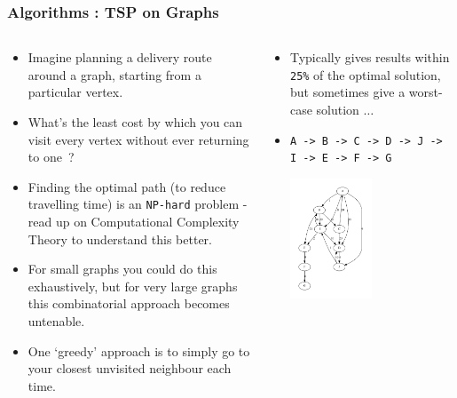 \begin{frame}[fragile]
\frametitle{Algorithms : TSP on Graphs}
\begin{columns}[T]

\begin{column}{0.45\textwidth}
\begin{itemize}[<+->]
\item Imagine planning a delivery route around a graph, starting from a particular vertex.
\item What's the least cost by which you can visit every vertex without ever returning to one~?
\item Finding the optimal path (to reduce travelling time) is an \verb^NP-hard^ problem - 
read up on Computational Complexity Theory to understand this better.
\item For small graphs you could do this exhaustively, but for very large graphs this combinatorial approach becomes untenable.
\item One `greedy' approach is to simply go to your closest unvisited neighbour each time.
\end{itemize}
\end{column}

\pause
\begin{column}{0.45\textwidth}
\begin{itemize}[<+->]
\item Typically gives results within \verb^25%^
of the optimal solution, but sometimes give a worst-case solution $\ldots$
\item 
{\scriptsize \verb^A -> B -> C -> D -> J -> I -> E -> F -> G^}

\begin{center}
\includegraphics[width=0.5\textwidth]{../Images/Linkedg.pdf}
\end{center}
\end{itemize}
\end{column}

\end{columns}
\end{frame}

